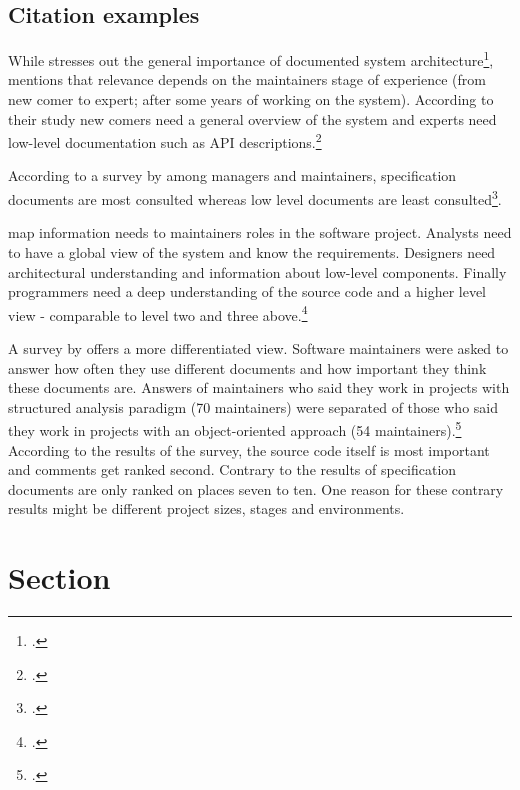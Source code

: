 \subsection{Citation examples}
\label{sec:relevance_of_documentation}


While \citeauthor{tilley_1992} stresses out the general importance of documented
system architecture\footcite[Cf.][]{tilley_1992}, 
\citeauthor{cioch_96} mentions that relevance depends on the
maintainers stage of experience (from new comer to expert; after some years of
working on the system). According to their study new comers need a general
overview of the system and experts need low-level documentation such as API
descriptions.\footcite[Cf.][]{cioch_96}

According to a survey by \citeauthor{forward_relevance_2002} among managers and
maintainers, specification documents are most consulted whereas low level
documents are least consulted\footcite[Cf.][28-30]{forward_relevance_2002}.

\citeauthor{grubb2003software} map information needs to maintainers roles
in the software project. Analysts need to have a global view of the system and
know the requirements. Designers need architectural understanding and
information about low-level components. Finally programmers need a deep
understanding of the source code and a higher level view - comparable to level
two and three above.\footcite[Cf.][103-106]{grubb2003software}

A survey by \citeauthor{de_souza_study_2005} offers a more differentiated view.
Software maintainers were asked to answer how often they use different documents
and how important they think these documents are. Answers of maintainers who
said they work in projects with structured analysis paradigm (70 maintainers)
were separated of those who said they work in projects with an object-oriented
approach (54 maintainers).\footcite[Cf.][69-74]{de_souza_study_2005}
According to the results of the survey, the source code itself is most important
and comments get ranked second. Contrary to the results of \citeauthor{forward_relevance_2002}
specification documents are only ranked on places seven to ten.
One reason for these contrary results might be different project sizes, stages
and environments.


\FloatBarrier %
\newpage
\section{Section}

